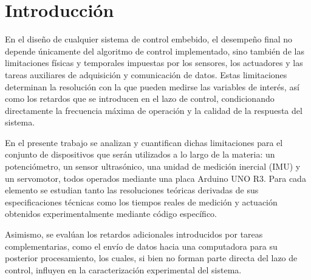 \documentclass[a4paper,12pt]{article}
\begin{document}
\begin{abstract}
En este trabajo se estudian y cuantifican las limitaciones de resolución y los retardos temporales introducidos por los sensores, actuadores y tareas auxiliares que intervienen en un sistema de control embebido basado en Arduino UNO R3. Se analizan un potenciómetro, un sensor ultrasónico, una IMU y un servomotor, determinando tanto sus resoluciones teóricas a partir de las hojas de datos como los tiempos reales de medición y actuación obtenidos experimentalmente. Además, se evalúa el impacto del envío de datos hacia una computadora en la caracterización del sistema. Este análisis permite disponer de una descripción cuantitativa precisa del desempeño del \textit{hardware} utilizado, información esencial para el diseño y la correcta interpretación de futuros lazos de control.
\end{abstract}

\newpage

\tableofcontents

\newpage

\section{Introducción}

En el diseño de cualquier sistema de control embebido, el desempeño final no depende únicamente del algoritmo de control implementado, sino también de las limitaciones físicas y temporales impuestas por los sensores, los actuadores y las tareas auxiliares de adquisición y comunicación de datos. Estas limitaciones determinan la resolución con la que pueden medirse las variables de interés, así como los retardos que se introducen en el lazo de control, condicionando directamente la frecuencia máxima de operación y la calidad de la respuesta del sistema.

En el presente trabajo se analizan y cuantifican dichas limitaciones para el conjunto de dispositivos que serán utilizados a lo largo de la materia: un potenciómetro, un sensor ultrasónico, una unidad de medición inercial (IMU) y un servomotor, todos operados mediante una placa Arduino UNO R3. Para cada elemento se estudian tanto las resoluciones teóricas derivadas de sus especificaciones técnicas como los tiempos reales de medición y actuación obtenidos experimentalmente mediante código específico.

Asimismo, se evalúan los retardos adicionales introducidos por tareas complementarias, como el envío de datos hacia una computadora para su posterior procesamiento, los cuales, si bien no forman parte directa del lazo de control, influyen en la caracterización experimental del sistema.
\end{document}
